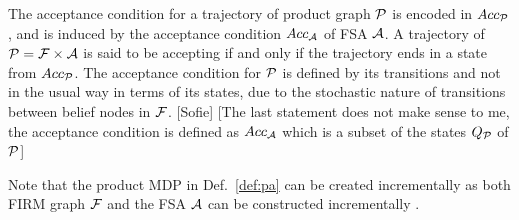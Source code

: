 \documentclass[conference]{IEEEtran}
\newcommand{\sofie}[1]{{\color{purple} [Sofie] #1}}
\begin{document}



The acceptance condition for a trajectory of product graph $\mathcal{P}$ is encoded in
$Acc_{\mathcal{P}}$, and is induced by the acceptance condition $Acc_{\mathcal{A}}$ of
FSA $\mathcal{A}$.
A trajectory of $\mathcal{P} = \mathcal{F} \times \mathcal{A}$ is said to be accepting
if and only if the trajectory ends in a state from $Acc_{\mathcal{P}}$. The acceptance condition for $\mathcal{P}$ is defined by its transitions and not in the usual way in terms of its states, due to the stochastic nature of transitions between belief nodes in $\mathcal{F}$.
\sofie{[The last statement does not make sense to me, the acceptance condition is defined as $Acc_{\mathcal{A}}$ which is a subset of the states $Q_{\mathcal{P}} $ of $\mathcal{P}$]}

\begin{remark}
Note that the product MDP in Def.~\ref{def:pa} can be created incrementally as both FIRM graph $\mathcal{F}$ and the FSA $\mathcal{A}$ can be constructed incrementally \cite{Agha14,VaBe-IROS-2013}.
\end{remark}
\end{document}
